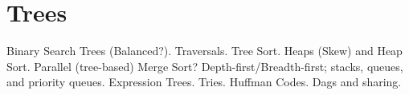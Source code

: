 
\section{Trees}
Binary Search Trees (Balanced?). Traversals. Tree Sort. Heaps (Skew) and Heap Sort. Parallel (tree-based) Merge Sort? Depth-first/Breadth-first; stacks, queues, and priority queues. Expression Trees. Tries. Huffman Codes. Dags and sharing.
